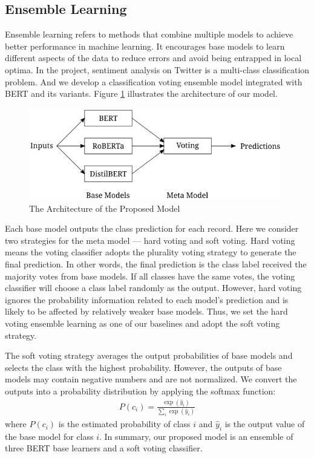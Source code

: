 \documentclass[runningheads]{llncs}
\begin{document}
\subsection{Ensemble Learning}
Ensemble learning refers to methods that combine multiple models to achieve better performance in machine learning. It encourages base models to learn different aspects of the data to reduce errors and avoid being entrapped in local optima. In the project, sentiment analysis on Twitter is a multi-class classification problem. And we develop a classification voting ensemble model integrated with BERT and its variants. Figure \ref{fig:model} illustrates the architecture of our model.

\begin{figure}[!ht]
    \centering
    \includegraphics[width=11cm]{./figs/model.png}
    \caption{The Architecture of the Proposed Model}
    \label{fig:model}
\end{figure}

Each base model outputs the class prediction for each record. Here we consider two strategies for the meta model --- hard voting and soft voting. Hard voting means the voting classifier adopts the plurality voting strategy to generate the final prediction. In other words, the final prediction is the class label received the majority votes from base models. If all classes have the same votes, the voting classifier will choose a class label randomly as the output. However, hard voting ignores the probability information related to each model's prediction and is likely to be affected by relatively weaker base models. Thus, we set the hard voting ensemble learning as one of our baselines and adopt the soft voting strategy.

The soft voting strategy averages the output probabilities of base models and selects the class with the highest probability. However, the outputs of base models may contain negative numbers and are not normalized. We convert the outputs into a probability distribution by applying the softmax function:
\begin{align*}
    P(c_i) = \frac{\exp{(\hat{y}_i)}}{\sum_i \exp{(\hat{y}_i)}}
\end{align*}
where $P(c_i)$ is the estimated probability of class $i$ and $\hat{y}_i$ is the output value of the base model for class $i$. In summary, our proposed model is an ensemble of three BERT base learners and a soft voting classifier.
\end{document}
